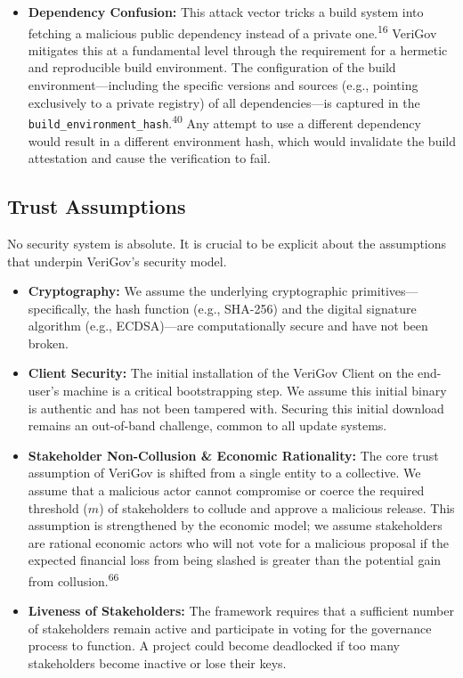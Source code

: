 \documentclass{article}
\begin{document}
\begin{itemize}
\item \textbf{Dependency Confusion:} This attack vector tricks a build system into fetching a malicious public dependency instead of a private one.\textsuperscript{16} VeriGov mitigates this at a fundamental level through the requirement for a hermetic and reproducible build environment. The configuration of the build environment---including the specific versions and sources (e.g., pointing exclusively to a private registry) of all dependencies---is captured in the \lstinline{build_environment_hash}.\textsuperscript{40} Any attempt to use a different dependency would result in a different environment hash, which would invalidate the build attestation and cause the verification to fail.
\end{itemize}

\subsection{Trust Assumptions}

No security system is absolute. It is crucial to be explicit about the assumptions that underpin VeriGov's security model.

\begin{itemize}
\item \textbf{Cryptography:} We assume the underlying cryptographic primitives---specifically, the hash function (e.g., SHA-256) and the digital signature algorithm (e.g., ECDSA)---are computationally secure and have not been broken.
\item \textbf{Client Security:} The initial installation of the VeriGov Client on the end-user's machine is a critical bootstrapping step. We assume this initial binary is authentic and has not been tampered with. Securing this initial download remains an out-of-band challenge, common to all update systems.
\item \textbf{Stakeholder Non-Collusion \& Economic Rationality:} The core trust assumption of VeriGov is shifted from a single entity to a collective. We assume that a malicious actor cannot compromise or coerce the required threshold ($m$) of stakeholders to collude and approve a malicious release. This assumption is strengthened by the economic model; we assume stakeholders are rational economic actors who will not vote for a malicious proposal if the expected financial loss from being slashed is greater than the potential gain from collusion.\textsuperscript{66}
\item \textbf{Liveness of Stakeholders:} The framework requires that a sufficient number of stakeholders remain active and participate in voting for the governance process to function. A project could become deadlocked if too many stakeholders become inactive or lose their keys.
\end{itemize}
\end{document}
